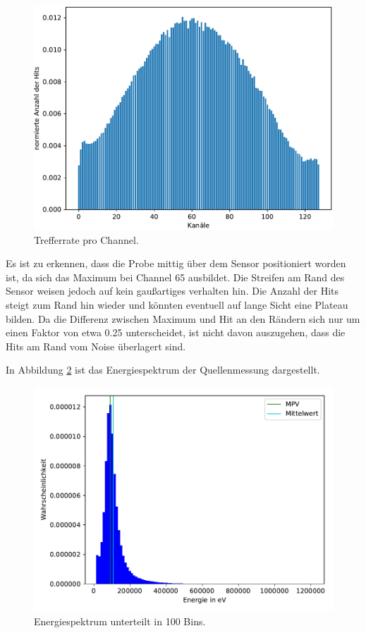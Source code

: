 \begin{figure}[H]
  \centering
  \includegraphics{build/Quellenmessung_Hitmap.pdf}
  \caption{Trefferrate pro Channel.}
  \label{fig:Hitmap}
\end{figure}

Es ist zu erkennen, dass die Probe mittig über dem Sensor positioniert worden ist, da sich das Maximum bei Channel 65 ausbildet. Die Streifen am Rand des Sensor weisen jedoch auf kein gaußartiges verhalten hin. Die Anzahl der Hits steigt zum Rand hin wieder und könnten eventuell auf lange Sicht eine Plateau bilden. Da die Differenz zwischen Maximum und Hit an den Rändern sich nur um einen Faktor von etwa 0.25 unterscheidet, ist nicht davon auszugehen, dass die Hits am Rand vom Noise überlagert sind.

In Abbildung \ref{fig:energy} ist das Energiespektrum der Quellenmessung dargestellt.

\begin{figure}[H]
  \centering
  \includegraphics{build/big_clusterenergie_charge.pdf}
  \caption{Energiespektrum unterteilt in 100 Bins.}
  \label{fig:energy}
\end{figure}

